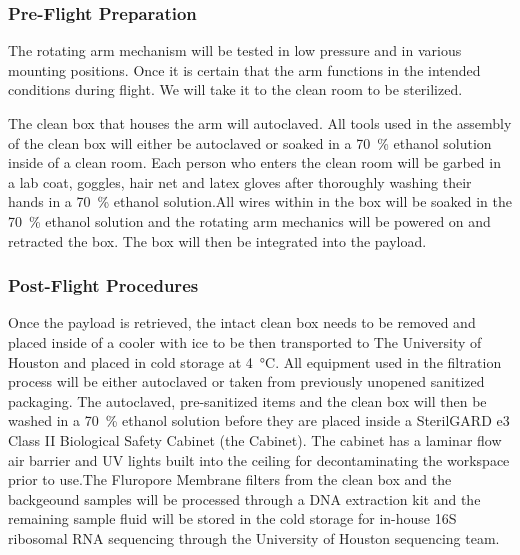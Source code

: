\subsubsection{Pre-Flight Preparation}
The rotating arm mechanism will be tested in low pressure and in various mounting positions. Once it is certain that the arm functions in the intended conditions during flight. We will take it to the clean room to be sterilized.  

The clean box that houses the arm  will autoclaved. All tools used in the assembly of the clean box will either be autoclaved or soaked in a \SI{70}{\percent} ethanol solution inside of a clean room. Each person who enters the clean room will be garbed in a lab coat, goggles, hair net and latex gloves after thoroughly washing their hands in a \SI{70}{\percent} ethanol solution.All wires within in the box will be soaked in the \SI{70}{\percent} ethanol solution and the rotating arm mechanics will be powered on and retracted the box. The box will then be integrated into the payload. 
\subsubsection{Post-Flight Procedures}

Once the payload is retrieved, the intact clean box needs to be removed and placed inside of a cooler with ice to be then transported to The University of Houston and placed in cold storage at \SI{4}{\celsius}. All equipment used in the filtration process will be either autoclaved or taken from previously unopened sanitized packaging. The autoclaved, pre-sanitized items and the clean box will then be washed in a \SI{70}{\percent} ethanol solution before they are placed inside a SterilGARD e3 Class II Biological Safety Cabinet (the Cabinet). The cabinet has a laminar flow air barrier and UV lights built into the ceiling for decontaminating the workspace prior to use.The Fluropore Membrane filters from the clean box and the backgeound samples will be processed through a DNA extraction kit and the remaining sample fluid will be stored in the cold storage for in-house 16S ribosomal RNA sequencing through the University of Houston sequencing team.  

